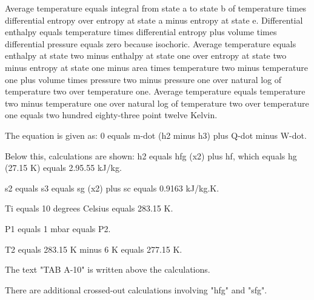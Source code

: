 Average temperature equals integral from state a to state b of temperature times differential entropy over entropy at state a minus entropy at state e.  
Differential enthalpy equals temperature times differential entropy plus volume times differential pressure equals zero because isochoric.  
Average temperature equals enthalpy at state two minus enthalpy at state one over entropy at state two minus entropy at state one minus area times temperature two minus temperature one plus volume times pressure two minus pressure one over natural log of temperature two over temperature one.  
Average temperature equals temperature two minus temperature one over natural log of temperature two over temperature one equals two hundred eighty-three point twelve Kelvin.

The equation is given as:
0 equals m-dot (h2 minus h3) plus Q-dot minus W-dot.

Below this, calculations are shown:
h2 equals hfg (x2) plus hf, which equals hg (27.15 K) equals 2.95.55 kJ/kg.

s2 equals s3 equals sg (x2) plus sc equals 0.9163 kJ/kg.K.

Ti equals 10 degrees Celsius equals 283.15 K.

P1 equals 1 mbar equals P2.

T2 equals 283.15 K minus 6 K equals 277.15 K.

The text "TAB A-10" is written above the calculations.

There are additional crossed-out calculations involving "hfg" and "sfg".